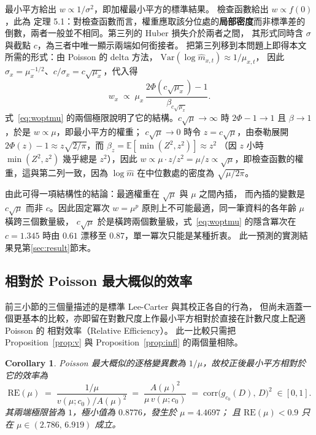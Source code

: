 \documentclass[UTF8, fontset=macnew, a4paper, 12pt]{ctexart}
\newtheorem{cor}{Corollary}
\newcommand{\Ex}{\mathbb{E}}
\begin{document}
最小平方給出 $w\propto1/\sigma^2$，即加權最小平方的標準結果。
檢查函數給出 $w\propto f(0)$，此為 \citet[第 5.3 節]{koenker2005}
定理 5.1：對檢查函數而言，權重應取該分位處的\textbf{局部密度}而非標準差的
倒數，兩者一般並不相同。第三列的 Huber 損失介於兩者之間，
其形式同時含 $\sigma$ 與截點 $c$，為三者中唯一顯示兩端如何銜接者。
把第三列移到本問題上即得本文所需的形式：由 Poisson 的 delta 方法，
$\mathrm{Var}(\log\hat m_{x,t})\approx1/\mu_{x,t}$，
因此 $\sigma_x=\mu_x^{-1/2}$、$c/\sigma_x=c\sqrt{\mu_x}$，代入得
\begin{equation}\label{eq:woptmu}
w_x\;\propto\;\mu_x\,\frac{2\Phi(c\sqrt{\mu_x})-1}{\beta_{c\sqrt{\mu_x}}} .
\end{equation}
式~\eqref{eq:woptmu} 的兩個極限說明了它的結構。$c\sqrt{\mu}\to\infty$ 時
$2\Phi-1\to1$ 且 $\beta\to1$，於是 $w\propto\mu$，即最小平方的權重；
$c\sqrt{\mu}\to0$ 時令 $z=c\sqrt{\mu}$，由泰勒展開
$2\Phi(z)-1\approx z\sqrt{2/\pi}$，而 $\beta_z=\Ex[\min(Z^2,z^2)]\approx z^2$
（因 $z$ 小時 $\min(Z^2,z^2)$ 幾乎總是 $z^2$），因此
$w\propto\mu\cdot z/z^{2}=\mu/z\propto\sqrt{\mu}$，即檢查函數的權重，這與第二列一致，因為 $\log\hat m$ 在中位數處的密度為 $\sqrt{\mu/2\pi}$。

由此可得一項結構性的結論：最適權重在 $\sqrt{\mu}$ 與 $\mu$ 之間內插，
而內插的變數是 $c\sqrt{\mu}$ 而非 $c$。因此固定冪次 $w=\mu^{p}$
原則上不可能最適，同一筆資料的各年齡 $\mu$ 橫跨三個數量級，
$c\sqrt{\mu}$ 於是橫跨兩個數量級，式~\eqref{eq:woptmu} 的隱含冪次在
$c=1.345$ 時由 $0.61$ 漂移至 $0.87$，單一冪次只能是某種折衷。
此一預測的實測結果見第\ref{sec:result}節末。

\subsection{相對於 Poisson 最大概似的效率}\label{subsec:releff}\label{subsec:secsum}\label{subsec:asym}

前三小節的三個量描述的是標準 Lee-Carter 與其校正各自的行為，
但尚未涵蓋一個更基本的比較，亦即留在對數尺度上作最小平方相對於直接在計數尺度上配適 Poisson 的
相對效率（Relative Efficiency）。
此一比較只需把 Proposition~\ref{prop:v} 與
Proposition~\ref{prop:infl} 的兩個量相除。

\begin{cor}\label{cor:re}
Poisson 最大概似的逐格變異數為 $1/\mu$，故校正後最小平方相對於它的效率為
\begin{equation}\label{eq:re}
\mathrm{RE}(\mu)\;=\;\frac{1/\mu}{v(\mu;c_0)/A(\mu)^2}
\;=\;\frac{A(\mu)^2}{\mu\,v(\mu;c_0)}
\;=\;\mathrm{corr}\bigl(g_{c_0}(D),\,D\bigr)^{2}\;\in[0,1].
\end{equation}
其兩端極限皆為 $1$，極小值為 $0.8776$，發生於 $\mu=4.4697$；
且 $\mathrm{RE}(\mu)<0.9$ 只在 $\mu\in(2.786,\,6.919)$ 成立。
\end{cor}
\end{document}
